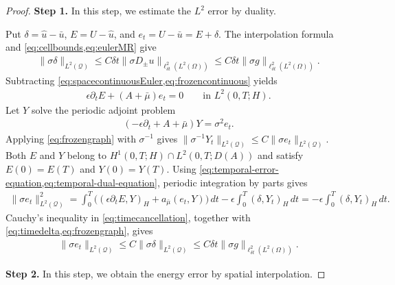 \documentclass[print,wide,eng]{draft}
\begin{document}
\begin{proof}
{\bf Step 1.} In this step, we estimate the $L^2$ error by duality.

Put $\delta=\widehat u-\bar u$, $E=U-\widehat u$, and $e_t=U-\bar u=E+\delta$. The interpolation formula and \cref{eq:cellbounds,eq:eulerMR} give
%
\begin{align}\label{eq:timedelta}
\|\sigma\delta\|_{L^2(\mathcal Q)}
\leq C{\delta t}\|\sigma D_\pm u\|_{\ell_{\delta t}^2(L^2(\Omega))}
\leq C{\delta t}\|\sigma g\|_{\ell_{\delta t}^2(L^2(\Omega))}.
\end{align}
%
Subtracting \cref{eq:spacecontinuousEuler,eq:frozencontinuous} yields
%
\begin{align}
\epsilon\partial_tE+(A+\bar\mu)e_t=0
\qquad\text{in }L^2(0,T;H).\label{eq:temporal-error-equation}
\end{align}
%
Let $Y$ solve the periodic adjoint problem
%
\begin{align}
(-\epsilon\partial_t+A+\bar\mu)Y=\sigma^2e_t.\label{eq:temporal-dual-equation}
\end{align}
%
Applying \cref{eq:frozengraph} with $\sigma^{-1}$ gives
$\|\sigma^{-1}Y_t\|_{L^2(\mathcal Q)}\leq C\|\sigma e_t\|_{L^2(\mathcal Q)}$.
Both $E$ and $Y$ belong to $H^1(0,T;H)\cap L^2(0,T;D(A))$ and satisfy $E(0)=E(T)$ and $Y(0)=Y(T)$. Using \cref{eq:temporal-error-equation,eq:temporal-dual-equation}, periodic integration by parts gives
%
\begin{align}\label{eq:timecancellation}
\|\sigma e_t\|_{L^2(\mathcal Q)}^2
=\int_0^T\bigl((\epsilon\partial_tE,Y)_H+a_{\bar\mu}(e_t,Y)\bigr)\,dt
-\epsilon\int_0^T(\delta,Y_t)_H\,dt
=-\epsilon\int_0^T(\delta,Y_t)_H\,dt.
\end{align}
%
Cauchy's inequality in \cref{eq:timecancellation}, together with \cref{eq:timedelta,eq:frozengraph}, gives
%
\begin{align}\label{eq:temporal-l2-error}
\|\sigma e_t\|_{L^2(\mathcal Q)}
\leq C\|\sigma\delta\|_{L^2(\mathcal Q)}
\leq C{\delta t}\|\sigma g\|_{\ell_{\delta t}^2(L^2(\Omega))}.
\end{align}
%

{\bf Step 2.} In this step, we  obtain the energy error by spatial interpolation.


\end{proof}
\end{document}

